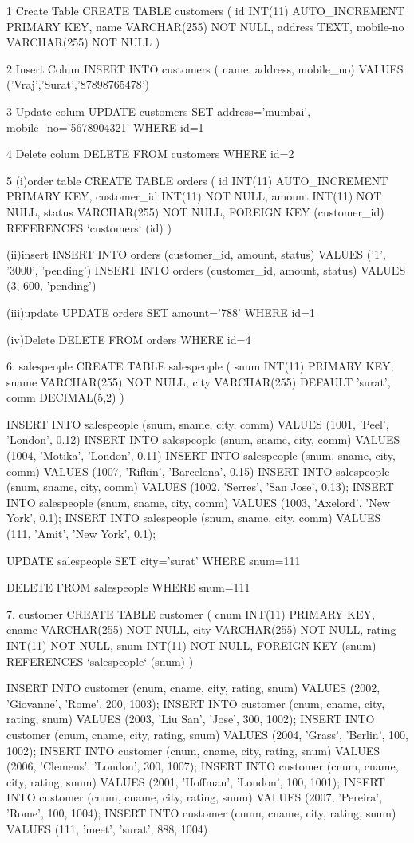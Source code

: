 1 Create Table
CREATE TABLE customers (
    id INT(11) AUTO_INCREMENT PRIMARY KEY,
    name VARCHAR(255) NOT NULL,
    address TEXT,
    mobile-no VARCHAR(255) NOT NULL
)


2 Insert Colum
INSERT INTO customers
( name, address, mobile_no)
VALUES ('Vraj','Surat','87898765478')


3 Update colum
UPDATE customers
SET address='mumbai', mobile_no='5678904321'
WHERE id=1


4 Delete colum
DELETE FROM customers WHERE id=2

5 
(i)order table
CREATE TABLE orders (
	id INT(11) AUTO_INCREMENT PRIMARY KEY,
    customer_id INT(11) NOT NULL,
    amount INT(11) NOT NULL,
    status VARCHAR(255) NOT NULL,
    FOREIGN KEY (customer_id) REFERENCES `customers` (id)
 )


(ii)insert
 INSERT INTO orders (customer_id, amount, status) VALUES ('1', '3000', 'pending')
 INSERT INTO orders (customer_id, amount, status) VALUES (3, 600, 'pending')

(iii)update
UPDATE orders 
SET amount='788'
WHERE id=1

(iv)Delete
DELETE FROM orders WHERE id=4


6. salespeople
CREATE TABLE salespeople (
	snum INT(11) PRIMARY KEY,
    sname VARCHAR(255) NOT NULL,
    city VARCHAR(255) DEFAULT 'surat',
    comm DECIMAL(5,2) 
)

INSERT INTO salespeople (snum, sname, city, comm) VALUES (1001, 'Peel', 'London', 0.12)
INSERT INTO salespeople (snum, sname, city, comm) VALUES (1004, 'Motika', 'London', 0.11)
INSERT INTO salespeople (snum, sname, city, comm) VALUES (1007, 'Rifkin', 'Barcelona', 0.15)
INSERT INTO salespeople (snum, sname, city, comm) VALUES (1002, 'Serres', 'San Jose', 0.13);
INSERT INTO salespeople (snum, sname, city, comm) VALUES (1003, 'Axelord', 'New York', 0.1);
INSERT INTO salespeople (snum, sname, city, comm) VALUES (111, 'Amit', 'New York', 0.1);


UPDATE salespeople
SET city='surat'
WHERE snum=111

DELETE FROM salespeople WHERE snum=111


7. customer
CREATE TABLE customer (
	cnum INT(11) PRIMARY KEY,
    cname VARCHAR(255) NOT NULL,
    city VARCHAR(255) NOT NULL,
    rating INT(11) NOT NULL,
    snum INT(11) NOT NULL,
    FOREIGN KEY (snum) REFERENCES `salespeople` (snum)
)

INSERT INTO customer (cnum, cname, city, rating, snum) VALUES (2002, 'Giovanne', 'Rome', 200, 1003);
INSERT INTO customer (cnum, cname, city, rating, snum) VALUES (2003, 'Liu San', 'Jose', 300, 1002);
INSERT INTO customer (cnum, cname, city, rating, snum) VALUES (2004, 'Grass', 'Berlin', 100, 1002);
INSERT INTO customer (cnum, cname, city, rating, snum) VALUES (2006, 'Clemens', 'London', 300, 1007);
INSERT INTO customer (cnum, cname, city, rating, snum) VALUES (2001, 'Hoffman', 'London', 100, 1001);
INSERT INTO customer (cnum, cname, city, rating, snum) VALUES (2007, 'Pereira', 'Rome', 100, 1004);
INSERT INTO customer (cnum, cname, city, rating, snum) VALUES (111, 'meet', 'surat', 888, 1004)

